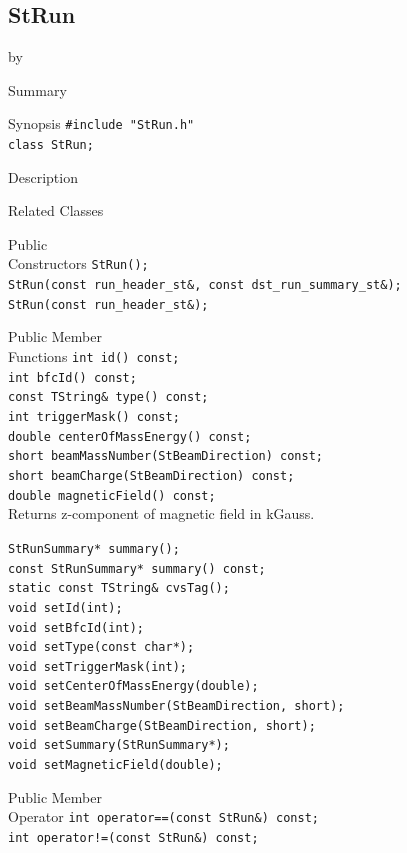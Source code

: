 \documentclass[twoside]{article}
\newcommand{\entrylabel}[1]{\mbox{\textbf{{#1}}}\hfil}%
\newenvironment{entry}
{\begin{list}{}%
    {\renewcommand{\makelabel}{\entrylabel}%
     \setlength{\labelwidth}{90pt}%
     \setlength{\leftmargin}{\labelwidth}
     \advance\leftmargin by \labelsep%
      }%
    }%
  {\end{list}}
\newcommand{\Entrylabel}[1]%
{\raisebox{0pt}[1ex][0pt]{\makebox[\labelwidth][l]%
    {\parbox[t]{\labelwidth}{\hspace{0pt}\textbf{{#1}}}}}}
\newenvironment{Entry}%
{\renewcommand{\entrylabel}{\Entrylabel}\begin{entry}}%
  {\end{entry}}
\begin{document}
\subsection{StRun}
\label{sec:StRun}
\begin{Entry}
\item[Summary]
\item[Synopsis]
    \verb+#include "StRun.h"+\\
    \verb+class StRun;+\\
\item[Description]
\item[Related Classes]
\item[Public\\ Constructors]
    \verb+StRun();+\\
    \verb+StRun(const run_header_st&, const dst_run_summary_st&);+\\
    \verb+StRun(const run_header_st&);+\\
\item[Public Member\\ Functions]
    \verb+int id() const;+\\
    \verb+int bfcId() const;+\\
    \verb+const TString& type() const;+\\
    \verb+int triggerMask() const;+\\
    \verb+double centerOfMassEnergy() const;+\\
    \verb+short beamMassNumber(StBeamDirection) const;+\\
    \verb+short beamCharge(StBeamDirection) const;+\\

    \verb+double magneticField() const;+\\
    Returns z-component of magnetic field in kGauss.
    
    \verb+StRunSummary* summary();+\\
    \verb+const StRunSummary* summary() const;+\\
    \verb+static const TString& cvsTag();+\\
    \verb+void setId(int);+\\
    \verb+void setBfcId(int);+\\
    \verb+void setType(const char*);+\\
    \verb+void setTriggerMask(int);+\\
    \verb+void setCenterOfMassEnergy(double);+\\
    \verb+void setBeamMassNumber(StBeamDirection, short);+\\
    \verb+void setBeamCharge(StBeamDirection, short);+\\
    \verb+void setSummary(StRunSummary*);+\\
    \verb+void setMagneticField(double);+\\
\item[Public Member\\ Operator]
    \verb+int operator==(const StRun&) const;+\\
    \verb+int operator!=(const StRun&) const;+\\
\end{Entry}
\clearpage
\end{document}
